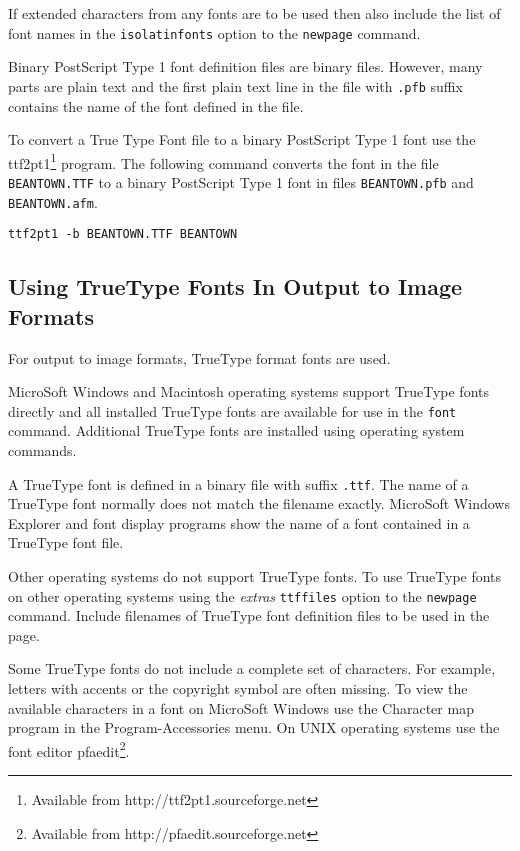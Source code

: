 If extended characters from any fonts are to be used then also
include the list of font names in the \texttt{isolatinfonts} option
to the \texttt{newpage} command.

Binary PostScript Type 1 font definition files are binary files.
However, many parts are plain text and the first plain text
line in the file with \texttt{.pfb} suffix contains the name
of the font defined in the file.

To convert a True Type Font file to a binary  PostScript Type 1 font use the
ttf2pt1\footnote{Available from http://ttf2pt1.sourceforge.net} program.  The
following command converts the font in the file \texttt{BEANTOWN.TTF} to a
binary PostScript Type 1 font in files
\texttt{BEANTOWN.pfb} and
\texttt{BEANTOWN.afm}.

\begin{verbatim}
ttf2pt1 -b BEANTOWN.TTF BEANTOWN
\end{verbatim}

\subsection{Using TrueType Fonts In Output to Image Formats}
\label{ttffonts}

For output to image formats, TrueType format fonts are used.

MicroSoft Windows and Macintosh operating systems support TrueType
fonts directly and all installed TrueType fonts are available
for use in the \texttt{font} command.
Additional TrueType fonts are installed using operating system commands.

A TrueType font is defined in a binary file with suffix
\texttt{.ttf}.
The name of a TrueType font normally does not match the filename exactly.
MicroSoft Windows Explorer and font display programs show the name of
a font contained in a TrueType font file.

Other operating systems do not support TrueType fonts.  To use TrueType fonts
on other operating systems using the \textit{extras} \texttt{ttffiles} option
to the \texttt{newpage} command.  Include filenames of TrueType font definition
files to be used in the page.

Some TrueType fonts do not include a complete set of characters.
For example, letters with accents or the copyright symbol are often
missing.  To view the available characters in a font on MicroSoft Windows
use the Character map program in the Program-Accessories
menu.  On UNIX operating systems use the font editor
pfaedit\footnote{Available from http://pfaedit.sourceforge.net}.

